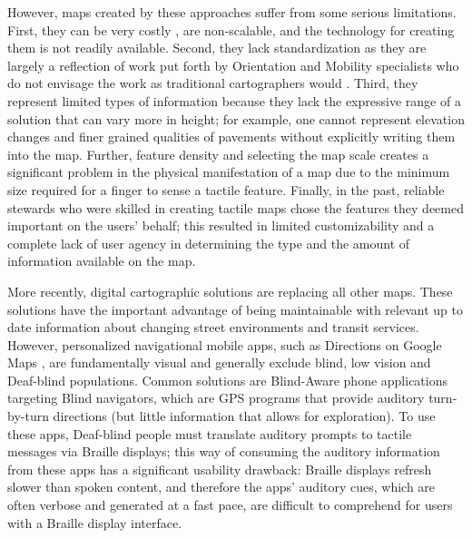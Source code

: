 However, maps created by these approaches suffer from some serious limitations. First, they can be very costly \cite{rice2005design}, are non-scalable, and the technology for creating them is not readily available. Second, they lack standardization as they are largely a reflection of work put forth by Orientation and Mobility specialists who do not envisage the work as traditional cartographers would \cite{lobben2012tactile, gual2012visual}. Third, they represent limited types of information because they lack the expressive range of a solution that can vary more in height; for example, one cannot represent elevation changes and finer grained qualities of pavements without explicitly writing them into the map. Further, feature density and selecting the map scale creates a significant problem in the physical manifestation of a map due to the minimum size required for a finger to sense a tactile feature. Finally, in the past, reliable stewards who were skilled in creating tactile maps chose the features they deemed important on the users’ behalf; this resulted in limited customizability and a complete lack of user agency in determining the type and the amount of information available on the map. 


More recently, digital cartographic solutions are replacing all other maps. These solutions have the important advantage of being maintainable with relevant up to date information about changing street environments and transit services. However, personalized navigational mobile apps, such as Directions on Google Maps \cite{GoogleMaps}, are fundamentally visual and generally exclude blind, low vision and Deaf-blind populations. Common solutions are Blind-Aware phone applications targeting Blind navigators, which are GPS programs that provide auditory turn-by-turn directions (but little information that allows for exploration). To use these apps, Deaf-blind people must translate auditory prompts to tactile messages via Braille displays; this way of consuming the auditory information from these apps has a significant usability drawback: Braille displays refresh slower than spoken content, and therefore the apps' auditory cues, which are often verbose and generated at a fast pace, are difficult to comprehend for users with a Braille display interface.  

